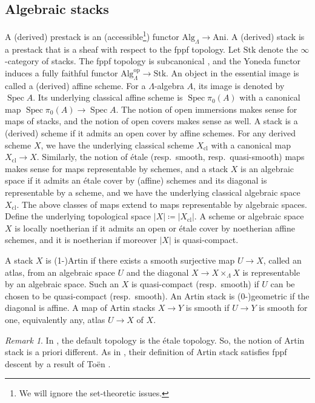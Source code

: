 \documentclass{amsart}
\theoremstyle{definition}
\theoremstyle{remark}
\newtheorem{remark}[theorem]{Remark}
\numberwithin{equation}{section}
\DeclareMathOperator{\Spec}{Spec}
\newcommand{\op}{\mathrm{op}}
\newcommand{\Alg}{\mathrm{Alg}}
\newcommand{\Ani}{\mathrm{Ani}}
\newcommand{\Stk}{\mathrm{Stk}}
\newcommand{\cl}{\mathrm{cl}}
\begin{document}
\subsection{Algebraic stacks}
A (derived) prestack is an (accessible\footnote{We will ignore the set-theoretic issues.}) functor $\Alg_{\Lambda}\to \Ani$. A (derived) stack is a prestack that is a sheaf with respect to the fppf topology. Let $\Stk$ denote the $\infty$-category of stacks. The fppf topology is subcanonical \cite[Example 4.2.4]{LurieThesis}, and the Yoneda functor induces a fully faithful functor $\Alg_{\Lambda}^\op\to \Stk$. An object in the essential image is called a (derived) affine scheme. For a $\Lambda$-algebra $A$, its image is denoted by $\Spec A$. Its underlying classical affine scheme is $\Spec \pi_0 (A)$ with a canonical map $\Spec \pi_0 (A)\to \Spec A$. The notion of open immersions makes sense for maps of stacks, and the notion of open covers makes sense as well. A stack is a (derived) scheme if it admits an open cover by affine schemes. For any derived scheme $X$, we have the underlying classical scheme $X_{\cl}$ with a canonical map $X_{\cl}\to X$. Similarly, the notion of \'etale (resp.~smooth, resp.~quasi-smooth) maps makes sense for maps representable by schemes, and a stack $X$ is an algebraic space if it admits an \'etale cover by (affine) schemes and its diagonal is representable by a scheme, and we have the underlying classical algebraic space $X_{\cl}$. The above classes of maps extend to maps representable by algebraic spaces. Define the underlying topological space $\lvert X\rvert \coloneq \lvert X_{\cl}\rvert$. A scheme or algebraic space $X$ is locally noetherian if it admits an open or \'etale cover by noetherian affine schemes, and it is noetherian if moreover $\lvert X\rvert$ is quasi-compact. 

A stack $X$ is (1-)Artin if there exists a smooth surjective map $U\to X$, called an atlas, from an algebraic space $U$ and the diagonal $X\to X\times_{\Lambda}X$ is representable by an algebraic space. Such an $X$ is quasi-compact (resp.~smooth) if $U$ can be chosen to be quasi-compact (resp.~smooth). An Artin stack is (0-)geometric if the diagonal is affine. A map of Artin stacks $X\to Y$ is smooth if $U\to Y$ is smooth for one, equivalently any, atlas $U\to X$ of $X$.  

\begin{remark}
In \cite{GRI}, the default topology is the \'etale topology. So, the notion of Artin stack is a priori different. As in \cite[Remark 2.4.1.4]{GRI}, their definition of Artin stack satisfies fppf descent by a result of To\"en \cite[Theorem 2.1]{Toen}. 
\end{remark}
\end{document}
